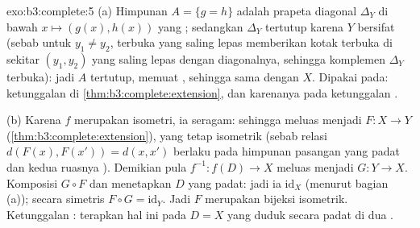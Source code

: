 \begin{solution}{exo:b3:complete:5}
(a) Himpunan $A = \{g = h\}$ adalah prapeta diagonal
$\Delta_Y$ di bawah $x \mapsto (g(x), h(x))$ yang ; sedangkan $\Delta_Y$
tertutup karena $Y$ bersifat  (sebab untuk $y_1 \neq y_2$,
 terbuka yang saling lepas memberikan kotak terbuka di sekitar $(y_1,
y_2)$ yang saling lepas dengan diagonalnya, sehingga komplemen
$\Delta_Y$ terbuka): jadi $A$
tertutup, memuat , sehingga sama dengan $X$. Dipakai pada: ketunggalan di
\cref{thm:b3:complete:extension}, dan karenanya pada ketunggalan
.

(b) Karena $f$ merupakan isometri, ia  seragam: sehingga meluas menjadi
$F\colon X \to Y$ (\cref{thm:b3:complete:extension}), yang tetap
isometrik (sebab relasi $d(F(x), F(x')) = d(x, x')$ berlaku pada
himpunan pasangan yang padat dan kedua ruasnya ). Demikian pula
$f^{-1}\colon f(D) \to X$ meluas menjadi $G \colon Y \to X$. Komposisi
$G \circ F$  dan menetapkan $D$ yang padat: jadi ia
$\mathrm{id}_X$ (menurut bagian (a)); secara simetris $F \circ G =
\mathrm{id}_Y$. Jadi $F$ merupakan bijeksi isometrik. Ketunggalan
: terapkan hal ini pada $D = X$ yang duduk secara padat di dua
.
\end{solution}


